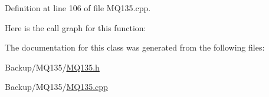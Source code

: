 Definition at line 106 of file M\+Q135.\+cpp.



Here is the call graph for this function\+:




The documentation for this class was generated from the following files\+:\begin{DoxyCompactItemize}
\item 
Backup/\+M\+Q135/\hyperlink{_m_q135_8h}{M\+Q135.\+h}\item 
Backup/\+M\+Q135/\hyperlink{_m_q135_8cpp}{M\+Q135.\+cpp}\end{DoxyCompactItemize}
